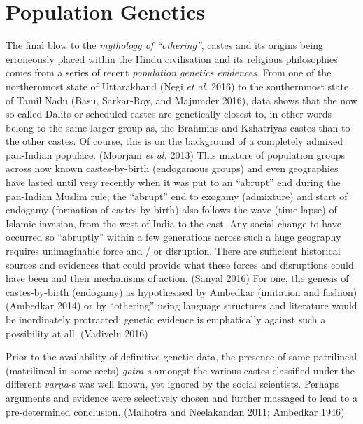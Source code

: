 \newpage

\section*{Population Genetics}

The final blow to the \textit{mythology of “othering”}, castes and its origins being erroneously placed within the Hindu civilisation and its religious philosophies comes from a series of recent \textit{population genetics evidences}. From one of the northernmost state of Uttarakhand (Negi \textit{et al}. 2016) to the southernmost state of Tamil Nadu (Basu, Sarkar-Roy, and Majumder 2016), data shows that the now so-called Dalits or scheduled castes are genetically closest to, in other words belong to the same larger group as, the Brahmins and Kshatriyas castes than to the other castes. Of course, this is on the background of a completely admixed pan-Indian populace. (Moorjani \textit{et al.} 2013) This mixture of population groups across now known castes-by-birth (endogamous groups) and even geographies have lasted until very recently when it was put to an “abrupt” end during the pan-Indian Muslim rule; the “abrupt” end to exogamy (admixture) and start of endogamy (formation of castes-by-birth) also follows the wave (time lapse) of Islamic invasion, from the west of India to the east. Any social change to have occurred so “abruptly” within a few generations across such a huge geography requires unimaginable force and / or disruption. There are sufficient historical sources and evidences that could provide what these forces and disruptions could have been and their mechanisms of action. (Sanyal 2016) For one, the genesis of castes-by-birth (endogamy) as hypothesised by Ambedkar (imitation and fashion) (Ambedkar 2014) or by “othering” using language structures and literature would be inordinately protracted: genetic evidence is emphatically against such a possibility at all. (Vadivelu 2016)

\vspace{.1cm}

Prior to the availability of definitive genetic data, the presence of same patrilineal (matrilineal in some sects) \textit{gotra-s} amongst the various castes classified under the different \textit{varṇa}-s was well known, yet ignored by the social scientists. Perhaps arguments and evidence were selectively chosen and further massaged to lead to a pre-determined conclusion. (Malhotra and Neelakandan 2011; Ambedkar 1946)

